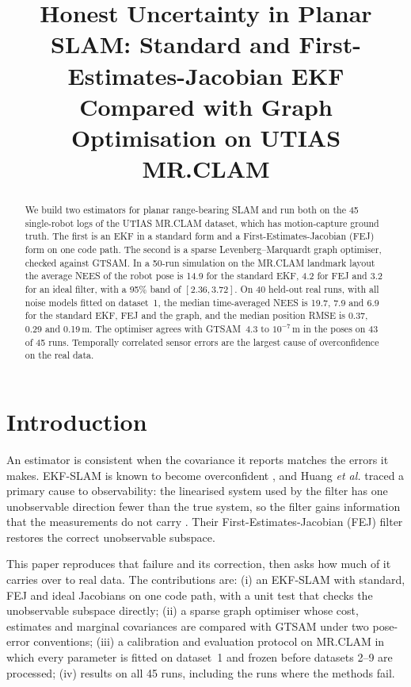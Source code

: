 \documentclass[conference]{IEEEtran}
\begin{document}
\title{Honest Uncertainty in Planar SLAM: Standard and First-Estimates-Jacobian EKF Compared with Graph Optimisation on UTIAS MR.CLAM}

\author{
}

\maketitle

\begin{abstract}
We build two estimators for planar range-bearing SLAM and run both on the 45 single-robot logs of the UTIAS MR.CLAM dataset, which has motion-capture ground truth. The first is an EKF in a standard form and a First-Estimates-Jacobian (FEJ) form on one code path. The second is a sparse Levenberg--Marquardt graph optimiser, checked against GTSAM. In a 50-run simulation on the MR.CLAM landmark layout the average NEES of the robot pose is 14.9 for the standard EKF, 4.2 for FEJ and 3.2 for an ideal filter, with a 95\% band of $[2.36, 3.72]$. On 40 held-out real runs, with all noise models fitted on dataset~1, the median time-averaged NEES is 19.7, 7.9 and 6.9 for the standard EKF, FEJ and the graph, and the median position RMSE is 0.37, 0.29 and 0.19\,m. The optimiser agrees with GTSAM~4.3 to $10^{-7}$\,m in the poses on 43 of 45 runs. Temporally correlated sensor errors are the largest cause of overconfidence on the real data.
\end{abstract}

\section{Introduction}
An estimator is consistent when the covariance it reports matches the errors it makes. EKF-SLAM is known to become overconfident \cite{bailey2006}, and Huang \emph{et al.} traced a primary cause to observability: the linearised system used by the filter has one unobservable direction fewer than the true system, so the filter gains information that the measurements do not carry \cite{huang2008,huang2010}. Their First-Estimates-Jacobian (FEJ) filter restores the correct unobservable subspace.

This paper reproduces that failure and its correction, then asks how much of it carries over to real data. The contributions are: (i) an EKF-SLAM with standard, FEJ and ideal Jacobians on one code path, with a unit test that checks the unobservable subspace directly; (ii) a sparse graph optimiser whose cost, estimates and marginal covariances are compared with GTSAM under two pose-error conventions; (iii) a calibration and evaluation protocol on MR.CLAM \cite{leung2011} in which every parameter is fitted on dataset~1 and frozen before datasets 2--9 are processed; (iv) results on all 45 runs, including the runs where the methods fail.
\end{document}
